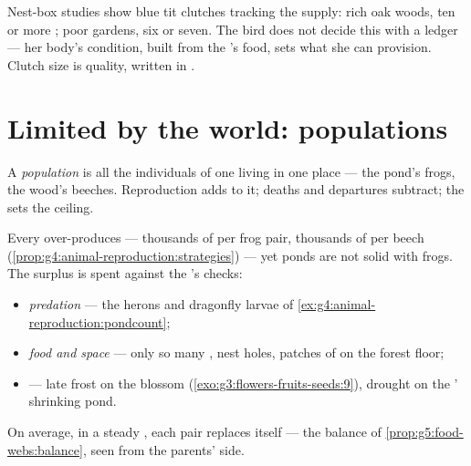 \begin{example}\label{ex:g8:reproduction-and-environment:clutch}
Nest-box studies show blue tit clutches tracking the
 supply: rich oak woods, ten or more ;
poor gardens, six or seven. The bird does not decide this
with a ledger --- her body's condition, built from the
's food, sets what she can provision. Clutch size
is  quality, written in .
\end{example}

\section{Limited by the world: populations}

\begin{definition}[Population]\label{def:g8:reproduction-and-environment:population}
A \emph{population} is all the
individuals of one  living in one place --- the
pond's frogs, the wood's beeches. Reproduction adds to it;
deaths and departures subtract; the  sets the
ceiling.
\end{definition}

\begin{proposition}\label{prop:g8:reproduction-and-environment:limits}
Every  over-produces --- thousands of  per frog
pair, thousands of  per beech
(\cref{prop:g4:animal-reproduction:strategies}) --- yet
ponds are not solid with frogs. The surplus is spent
against the 's checks:
\begin{itemize}
  \item \emph{predation} --- the herons and dragonfly
        larvae of \cref{ex:g4:animal-reproduction:pondcount};
  \item \emph{food and space} --- only so many
        , nest holes, patches of  on the
        forest floor;
  \item \emph{} --- late frost on the blossom
        (\cref{exo:g3:flowers-fruits-seeds:9}), drought on
        the ' shrinking pond.
\end{itemize}
On average, in a steady , each pair replaces
itself --- the balance of
\cref{prop:g5:food-webs:balance}, seen from the parents'
side.
\end{proposition}
\admitted

